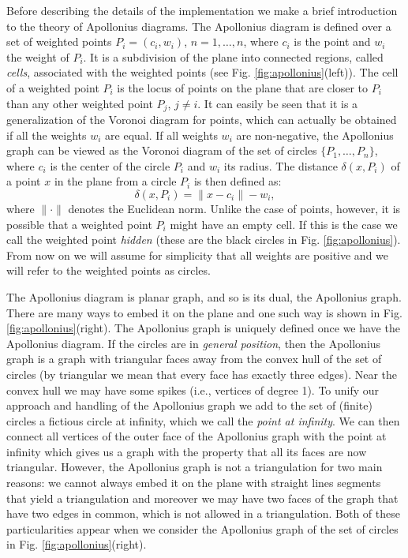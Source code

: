 Before describing the details of the implementation we make a brief
introduction to the theory of Apollonius diagrams.
The Apollonius diagram is defined over a set of weighted points
$P_i=(c_i,w_i)$, $n=1,\ldots,n$, where $c_i$ is the point and $w_i$
the weight of $P_i$. It is a subdivision of the plane into connected
regions, called {\em cells}, associated with the weighted points (see
Fig. \ref{fig:apollonius}(left)). The cell of a 
weighted point $P_i$ is the locus of points on the plane that are
closer to $P_i$ than any other weighted point $P_j$, $j\ne i$.
It can easily be seen that it is a generalization of the Voronoi
diagram for points, which can actually be obtained if all the weights
$w_i$ are equal. If all weights $w_i$ are non-negative, the Apollonius
graph can be viewed as the Voronoi diagram of the set of circles
$\{P_1,\ldots, P_n\}$, where $c_i$ is the center of the circle $P_i$
and $w_i$ its radius. The distance $\delta(x, P_i)$ of a point $x$ in
the plane from a circle $P_i$ is then defined as:
\[      \delta(x,P_i)=\|x-c_i\|-w_i,\]
where $\|\cdot\|$ denotes the Euclidean norm.
Unlike the case of points, however, it is possible
that a weighted point $P_i$ might have an empty cell. If this is the
case we call the weighted point {\em hidden} (these are the black
circles in Fig. \ref{fig:apollonius}). From now on we will assume for
simplicity that all weights are positive and we will refer to the
weighted points as circles.


The Apollonius diagram is planar graph, and so is its dual, the
Apollonius graph. There are many ways to embed it on the plane and one
such way is shown in Fig. \ref{fig:apollonius}(right).
The Apollonius graph is uniquely defined once we have
the Apollonius diagram. If the circles are in {\em general position},
then the Apollonius graph is a graph with triangular faces away from
the convex hull of the set of circles (by triangular we mean that
every face has exactly three edges). Near the convex hull we may
have some spikes (i.e., vertices of degree 1). To unify our approach
and handling of the Apollonius graph we add to the set of (finite)
circles a fictious circle at infinity, which we call the
{\em point at infinity}. We can then connect all vertices of the outer
face of the Apollonius graph with the point at infinity which gives us
a graph with the property that all its faces are now
triangular. However, the Apollonius graph is not a triangulation for
two main reasons: we cannot always embed it on the plane with straight
lines segments that yield a triangulation and moreover we may have two
faces of the graph that have two edges in common, which is not allowed
in a triangulation. Both of these particularities appear when we
consider the Apollonius graph of the set of circles in
Fig. \ref{fig:apollonius}(right).



